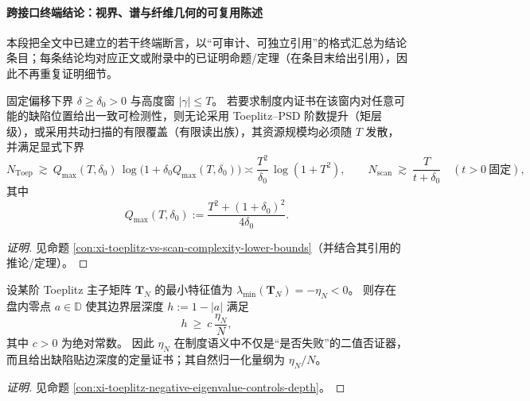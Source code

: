 \paragraph{跨接口终端结论：视界、谱与纤维几何的可复用陈述}
本段把全文中已建立的若干终端断言，以“可审计、可独立引用”的格式汇总为结论条目；每条结论均对应正文或附录中的已证明命题/定理（在条目末给出引用），因此不再重复证明细节。

\begin{conclusion}\label{con:xi-terminal-horizon-certificate-quadratic-linear-lb}
固定偏移下界 \(\delta\ge \delta_0>0\) 与高度窗 \(|\gamma|\le T\)。
若要求制度内证书在该窗内对任意可能的缺陷位置给出一致可检测性，则无论采用 Toeplitz--PSD 阶数提升（矩层级），或采用共动扫描的有限覆盖（有限读出族），其资源规模均必须随 \(T\) 发散，并满足显式下界
\[
N_{\mathrm{Toep}}\ \gtrsim\ Q_{\max}(T,\delta_0)\,\log\!\bigl(1+\delta_0 Q_{\max}(T,\delta_0)\bigr)
\asymp \frac{T^2}{\delta_0}\,\log(1+T^2),
\qquad
N_{\mathrm{scan}}\ \gtrsim\ \frac{T}{t+\delta_0}\quad(t>0\ \text{固定}),
\]
其中
\[
Q_{\max}(T,\delta_0):=\frac{T^2+(1+\delta_0)^2}{4\delta_0}.
\]
\end{conclusion}
\begin{proof}[证明]
见命题 \ref{con:xi-toeplitz-vs-scan-complexity-lower-bounds}（并结合其引用的推论/定理）。
\end{proof}

\begin{conclusion}\label{con:xi-terminal-negative-spectrum-boundary-layer-depth}
设某阶 Toeplitz 主子矩阵 \(\mathbf{T}_N\) 的最小特征值为 \(\lambda_{\min}(\mathbf{T}_N)=-\eta_N<0\)。
则存在盘内零点 \(a\in\mathbb D\) 使其边界层深度 \(h:=1-|a|\) 满足
\[
h\ \ge\ c\,\frac{\eta_N}{N},
\]
其中 \(c>0\) 为绝对常数。
因此 \(\eta_N\) 在制度语义中不仅是“是否失败”的二值否证器，而且给出缺陷贴边深度的定量证书；其自然归一化量纲为 \(\eta_N/N\)。
\end{conclusion}
\begin{proof}[证明]
见命题 \ref{con:xi-toeplitz-negative-eigenvalue-controls-depth}。
\end{proof}

